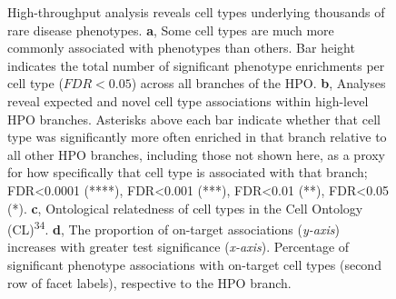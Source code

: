\documentclass[
]{report}
\begin{document}
\begin{figure}[H]


\caption{\label{fig-summaryD08295A6-16DC-499D-85A8-8BA656E013A2}High-throughput
analysis reveals cell types underlying thousands of rare disease
phenotypes. \textbf{a}, Some cell types are much more commonly
associated with phenotypes than others. Bar height indicates the total
number of significant phenotype enrichments per cell type (\(FDR<0.05\))
across all branches of the HPO. \textbf{b}, Analyses reveal expected and
novel cell type associations within high-level HPO branches. Asterisks
above each bar indicate whether that cell type was significantly more
often enriched in that branch relative to all other HPO branches,
including those not shown here, as a proxy for how specifically that
cell type is associated with that branch; FDR\textless0.0001 (****),
FDR\textless0.001 (***), FDR\textless0.01 (**), FDR\textless0.05 (*).
\textbf{c}, Ontological relatedness of cell types in the Cell Ontology
(CL)\textsuperscript{34}. \textbf{d}, The proportion of on-target
associations (\emph{y-axis}) increases with greater test significance
(\emph{x-axis}). Percentage of significant phenotype associations with
on-target cell types (second row of facet labels), respective to the HPO
branch.}

\end{figure}%
\end{document}
